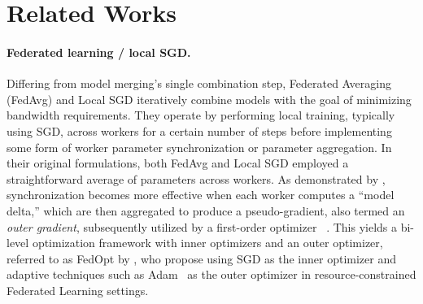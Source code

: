 \section{Related Works}
\label{sec:related_works}



\paragraph{Federated learning / local SGD.}  Differing from model merging's single combination step, Federated Averaging (FedAvg) \citep{mcmahan2017fedavg} and Local SGD \citep{stich2019local} iteratively combine models with the goal of minimizing bandwidth requirements. They operate by performing local training, typically using SGD, across workers for a certain number of steps before implementing some form of worker parameter synchronization or parameter aggregation.  In their original formulations, both FedAvg and Local SGD employed a straightforward average of parameters across workers.  As demonstrated by \cite{reddi2021adaptive}, synchronization becomes more effective when each worker computes a ``model delta,'' which are then aggregated to produce a pseudo-gradient, also termed an \textit{outer gradient}, subsequently utilized by a first-order optimizer ~\citep{reddi2021adaptive,ilharco2022patching}.  This yields a bi-level optimization framework with inner optimizers and an outer optimizer, referred to as FedOpt by \cite{reddi2021adaptive}, who propose using SGD as the inner optimizer and adaptive techniques such as Adam~\citep{kingma2014adam} as the outer optimizer in resource-constrained Federated Learning settings.

